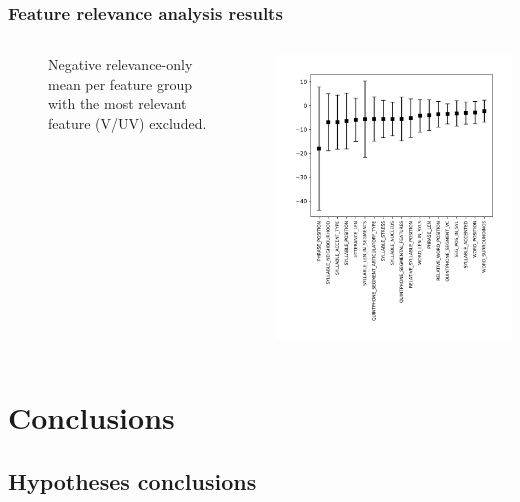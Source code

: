 \documentclass[a4paper,9pt]{beamer}
\theoremstyle{mytheoremstyle}
\begin{document}
\begin{frame}
\frametitle{Feature relevance analysis results}
\begin{columns}
\begin{figure}
	\caption{Negative relevance-only mean per feature group with the most relevant feature (V/UV) excluded.}
\end{figure}
\begin{center}
  \includegraphics[width=\textwidth]{res/feature_relevance_ranking_-_mean_(negative_only_sum)_-_general_feature_categories_-_no_vuv}
\end{center}
\end{columns}
\end{frame}


\section{Conclusions}

\subsection{Hypotheses conclusions}
\end{document}
